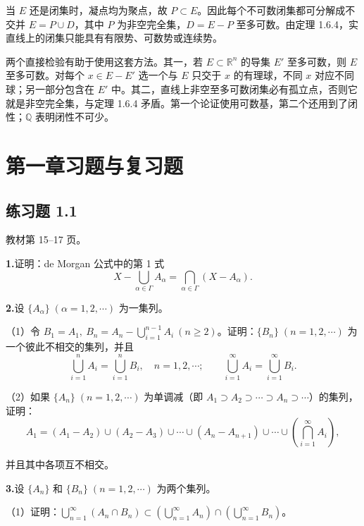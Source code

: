\documentclass[11pt,a4paper]{article}
\begin{document}
当 \(E\) 还是闭集时，凝点均为聚点，故 \(P\subset E\)。因此每个不可数闭集都可分解成不交并 \(E=P\cup D\)，其中 \(P\) 为非空完全集，\(D=E-P\) 至多可数。由定理 1.6.4，实直线上的闭集只能具有有限势、可数势或连续势。

两个直接检验有助于使用这套方法。其一，若 \(E\subset\mathbb R^n\) 的导集 \(E'\) 至多可数，则 \(E\) 至多可数。对每个 \(x\in E-E'\) 选一个与 \(E\) 只交于 \(x\) 的有理球，不同 \(x\) 对应不同球；另一部分包含在 \(E'\) 中。其二，直线上非空至多可数闭集必有孤立点，否则它就是非空完全集，与定理 1.6.4 矛盾。第一个论证使用可数基，第二个还用到了闭性；\(\mathbb Q\) 表明闭性不可少。

\clearpage{}\section*{第一章习题与复习题}
\subsection*{练习题 1.1}
\noindent 教材第 15--17 页。
\par{}\noindent\textbf{1.}\quad 证明：de Morgan 公式中的第 1 式
\[X-\bigcup_{\alpha\in\Gamma}A_\alpha=\bigcap_{\alpha\in\Gamma}(X-A_\alpha).\]
\par{}\noindent\textbf{2.}\quad 设 $\{A_\alpha\}\;(\alpha=1,2,\cdots)$ 为一集列。
\par\noindent （1）令 $B_1=A_1,\ B_n=A_n-\bigcup_{i=1}^{n-1}A_i\ (n\geq 2)$。证明：$\{B_n\}\;(n=1,2,\cdots)$ 为一个彼此不相交的集列，并且
\[\bigcup_{i=1}^n A_i=\bigcup_{i=1}^n B_i,\quad n=1,2,\cdots;\qquad \bigcup_{i=1}^\infty A_i=\bigcup_{i=1}^\infty B_i.\]
\par\noindent （2）如果 $\{A_n\}\;(n=1,2,\cdots)$ 为单调减（即 $A_1\supset A_2\supset\cdots\supset A_n\supset\cdots$）的集列，证明：
\[A_1=(A_1-A_2)\cup(A_2-A_3)\cup\cdots\cup(A_n-A_{n+1})\cup\cdots\cup\left(\bigcap_{i=1}^\infty A_i\right),\]
\par\noindent 并且其中各项互不相交。
\par{}\noindent\textbf{3.}\quad 设 $\{A_n\}$ 和 $\{B_n\}\;(n=1,2,\cdots)$ 为两个集列。
\par\noindent （1）证明：$\bigcup_{n=1}^\infty(A_n\cap B_n)\subset\left(\bigcup_{n=1}^\infty A_n\right)\cap\left(\bigcup_{n=1}^\infty B_n\right)$。
\end{document}
